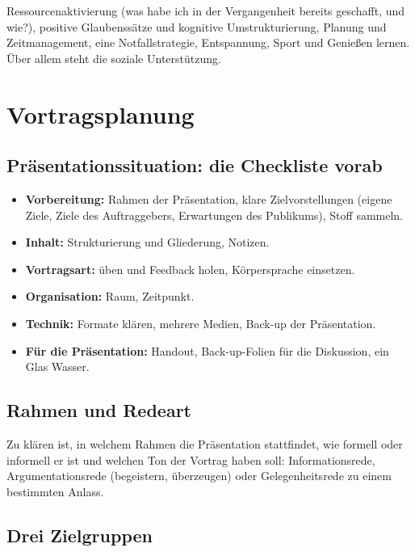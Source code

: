 \documentclass[12pt, a4paper]{article}
\begin{document}
Ressourcenaktivierung (was habe ich in der Vergangenheit bereits geschafft,
und wie?), positive Glaubenssätze und kognitive Umstrukturierung, Planung und
Zeitmanagement, eine Notfallstrategie, Entspannung, Sport und Genießen
lernen. Über allem steht die soziale Unterstützung.

\section{Vortragsplanung}

\subsection{Präsentationssituation: die Checkliste vorab}

\begin{itemize}
  \item \textbf{Vorbereitung:} Rahmen der Präsentation, klare
        Zielvorstellungen (eigene Ziele, Ziele des Auftraggebers,
        Erwartungen des Publikums), Stoff sammeln.
  \item \textbf{Inhalt:} Strukturierung und Gliederung, Notizen.
  \item \textbf{Vortragsart:} üben und Feedback holen, Körpersprache
        einsetzen.
  \item \textbf{Organisation:} Raum, Zeitpunkt.
  \item \textbf{Technik:} Formate klären, mehrere Medien, Back-up der
        Präsentation.
  \item \textbf{Für die Präsentation:} Handout, Back-up-Folien für die
        Diskussion, ein Glas Wasser.
\end{itemize}

\subsection{Rahmen und Redeart}

Zu klären ist, in welchem Rahmen die Präsentation stattfindet, wie formell
oder informell er ist und welchen Ton der Vortrag haben soll:
Informationsrede, Argumentationsrede (begeistern, überzeugen) oder
Gelegenheitsrede zu einem bestimmten Anlass.

\subsection{Drei Zielgruppen}
\end{document}
